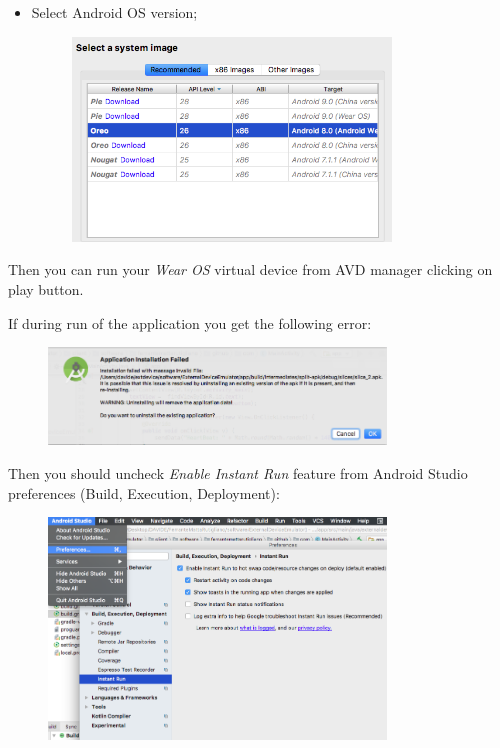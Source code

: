 \documentclass[a4paper]{article}
\begin{document}
\begin{itemize}
\begin{figure}[!htpb]
    \end{figure}
    \newpage
    \item Select Android OS version;
    \begin{figure}[!htpb]
    \centering
    \includegraphics[width=0.8\textwidth, keepaspectratio]{ITD/images/virtualdevice4.png}
    \end{figure}
\end{itemize}

Then you can run your \textit{Wear OS} virtual device from AVD manager clicking on play button.

If during run of the application you get the following error:
\begin{figure}[!htpb]
    \centering
    \includegraphics[width=0.8\textwidth, keepaspectratio]{ITD/images/extdev_err.png}
    \end{figure}

Then you should uncheck \textit{Enable Instant Run} feature from Android Studio preferences (Build, Execution, Deployment):
\begin{figure}[!htpb]
    \centering
    \includegraphics[width=0.8\textwidth, keepaspectratio]{ITD/images/extdev_err_solution.png}
    \end{figure}
\end{document}
